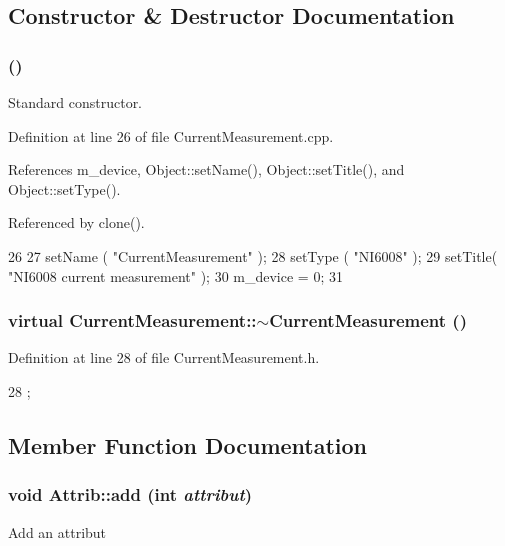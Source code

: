 \subsection{Constructor \& Destructor Documentation}
\hypertarget{classCurrentMeasurement_ad89184bc1f2386b71051d7976ec662f1}{
\subsubsection[{CurrentMeasurement}]{ ()}}
\label{classCurrentMeasurement_ad89184bc1f2386b71051d7976ec662f1}


Standard constructor. 

Definition at line 26 of file CurrentMeasurement.cpp.

References m\_\-device, Object::setName(), Object::setTitle(), and Object::setType().

Referenced by clone().


\begin{DoxyCode}
26                                         {
27   setName ( "CurrentMeasurement" );
28   setType ( "NI6008" );
29   setTitle( "NI6008 current measurement" );  
30   m_device = 0; 
31 }
\end{DoxyCode}
\hypertarget{classCurrentMeasurement_a86c291508b913b4b028567eeb8995c83}{
\subsubsection[{$\sim$CurrentMeasurement}]{\setlength{\rightskip}{0pt plus 5cm}virtual CurrentMeasurement::$\sim$CurrentMeasurement ()}}
\label{classCurrentMeasurement_a86c291508b913b4b028567eeb8995c83}


Definition at line 28 of file CurrentMeasurement.h.


\begin{DoxyCode}
28 {}; 
\end{DoxyCode}


\subsection{Member Function Documentation}
\hypertarget{classAttrib_a235f773af19c900264a190b00a3b4ad7}{
\subsubsection[{add}]{\setlength{\rightskip}{0pt plus 5cm}void Attrib::add (int {\em attribut})}}
\label{classAttrib_a235f773af19c900264a190b00a3b4ad7}
Add an attribut 

